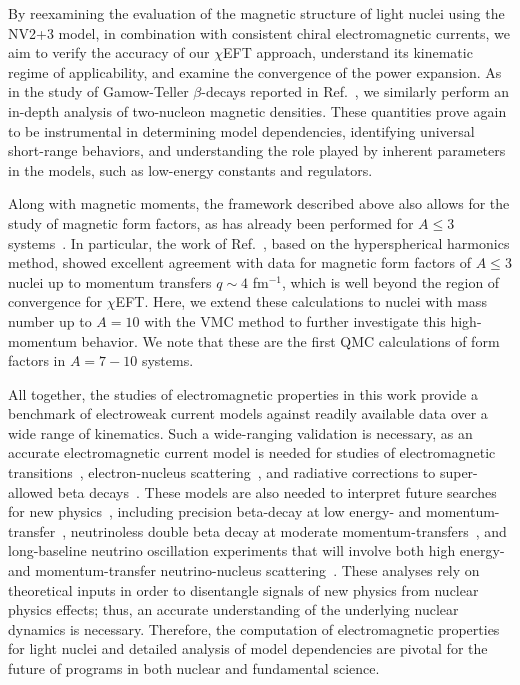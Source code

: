 \documentclass[aps,prc,floatfix,showpacs,twocolumn, preprintnumbers]{revtex4-2}
\begin{document}
By  reexamining  the  evaluation  of the magnetic structure of light nuclei using the NV2+3 model,  in  combination  with  consistent  chiral  electromagnetic currents, we aim to verify the accuracy of our $\chi$EFT approach, understand its kinematic regime of applicability, and examine the convergence of the power expansion. As in the study of Gamow-Teller $\beta$-decays reported in Ref.~\cite{King:2020wmp}, we similarly perform an in-depth analysis of two-nucleon magnetic densities. These quantities prove again to be instrumental in determining model dependencies, identifying universal short-range behaviors, and understanding the role played by inherent parameters in the models, such as low-energy constants and regulators.

Along with magnetic moments, the framework described above also allows for the study of magnetic form factors, as has already been performed for $A\le3$ systems~\cite{Gnech:2022vwr}. In particular, the work of Ref.~\cite{Gnech:2022vwr}, based on the  hyperspherical harmonics method, showed excellent agreement with data for magnetic form factors of $A\le 3$ nuclei up to momentum transfers $q\sim4$ fm$^{-1}$, which is well beyond the region of convergence for $\chi$EFT. Here, we extend these calculations to nuclei with mass number up to $A=10$ with the VMC method to further investigate this high-momentum behavior. We note that these are the first QMC calculations of form factors in $A=7-10$ systems. 

All together, the studies of electromagnetic properties in this work provide a benchmark of electroweak current models against readily available data over a wide range of kinematics. Such a wide-ranging validation is necessary, as an accurate electromagnetic current model is needed for studies of electromagnetic transitions~\cite{Wiringa:1998hr,Pastore:2012rp,Pastore:2014oda,Stroberg:2022ltv,Acharya:2023ird}, electron-nucleus scattering~\cite{Lovato:2013cua,Lovato:2015qka,Lovato:2016gkq,Pastore:2019urn,Andreoli:2021cxo,Sobczyk:2023mey,Sobczyk:2023sxh}, and radiative corrections to super-allowed beta decays~\cite{Seng:2022cnq,Cirigliano:2024rfk,Gennari:2024sbn}. These models are also needed to interpret future searches for new physics~\cite{King:2024zbv}, including precision beta-decay at low energy- and momentum-transfer~\cite{Gonzalez-Alonso:2018omy,Falkowski:2020pma,King:2022zkz,Glick-Magid:2021uwb,Brodeur:2023eul,King:2024zbv}, neutrinoless double beta decay at moderate momentum-transfers~\cite{Engel:2016xgb,Agostini:2022zub,Pastore:2017ofx,Cirigliano:2019vdj}, and long-baseline neutrino oscillation experiments that will involve both high energy- and momentum-transfer neutrino-nucleus scattering~\cite{Abe:2019,NOvA:2019cyt,Acciarri:2017,Aliaga:2014,Seo:2018,Abi:2020,Ruso:2022qes}. These analyses rely on theoretical inputs in order to disentangle signals of new physics from nuclear physics effects; thus, an accurate understanding of the underlying nuclear dynamics is necessary. Therefore, the computation of electromagnetic properties for light nuclei and detailed analysis of model dependencies are pivotal for the future of programs in both nuclear and fundamental science. 
\end{document}
